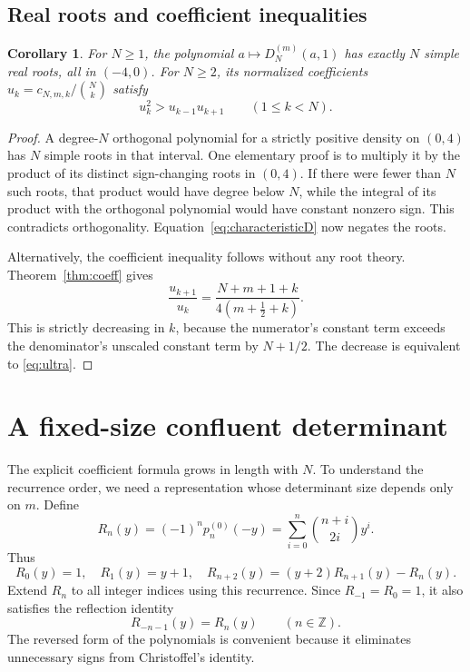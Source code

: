 \documentclass[11pt,a4paper]{article}
\numberwithin{equation}{section}
\newtheorem{corollary}[theorem]{Corollary}
\theoremstyle{definition}
\theoremstyle{remark}
\newcommand{\ZZ}{\mathbb Z}
\begin{document}
\subsection{Real roots and coefficient inequalities}
\begin{corollary}\label{cor:roots}
For $N\geq1$, the polynomial $a\mapsto D_N^{(m)}(a,1)$ has exactly $N$
simple real roots, all in $(-4,0)$.  For $N\geq2$, its normalized
coefficients $u_k=c_{N,m,k}/\binom Nk$ satisfy
\begin{equation}\label{eq:ultra}
 u_k^2>u_{k-1}u_{k+1}\qquad(1\leq k<N).
\end{equation}
\end{corollary}
\begin{proof}
A degree-$N$ orthogonal polynomial for a strictly positive density on
$(0,4)$ has $N$ simple roots in that interval.  One elementary proof
is to multiply it by the product of its distinct sign-changing roots
in $(0,4)$.  If there were fewer than $N$ such roots, that product
would have degree below $N$, while the integral of its product with
the orthogonal polynomial would have constant nonzero sign.  This
contradicts orthogonality.  Equation~\eqref{eq:characteristicD} now
negates the roots.

Alternatively, the coefficient inequality follows without any root
theory.  Theorem~\ref{thm:coeff} gives
\[
 \frac{u_{k+1}}{u_k}
 =\frac{N+m+1+k}{4(m+\tfrac12+k)}.
\]
This is strictly decreasing in $k$, because the numerator's constant
term exceeds the denominator's unscaled constant term by $N+1/2$.
The decrease is equivalent to \eqref{eq:ultra}.
\end{proof}

\section{A fixed-size confluent determinant}\label{sec:confluent}

The explicit coefficient formula grows in length with $N$.  To understand
the recurrence order, we need a representation whose determinant size
depends only on $m$.
Define
\begin{equation}\label{eq:R}
 R_n(y)=(-1)^np_n^{(0)}(-y)
       =\sum_{i=0}^n\binom{n+i}{2i}y^i.
\end{equation}
Thus
\begin{equation}\label{eq:Rrec}
 R_0(y)=1,\quad R_1(y)=y+1,\quad
 R_{n+2}(y)=(y+2)R_{n+1}(y)-R_n(y).
\end{equation}
Extend $R_n$ to all integer indices using this recurrence.  Since
$R_{-1}=R_0=1$, it also satisfies the reflection identity
\begin{equation}\label{eq:Rreflection}
 R_{-n-1}(y)=R_n(y)\qquad(n\in\ZZ).
\end{equation}
The reversed form of the polynomials is convenient because it eliminates
unnecessary signs from Christoffel's identity.
\end{document}

